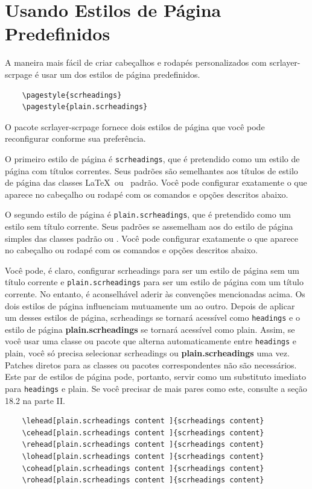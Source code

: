 \chapter{Usando Estilos de Página Predefinidos}
A maneira mais fácil de criar cabeçalhos e rodapés personalizados com scrlayer-scrpage é usar um dos estilos de página predefinidos.

\begin{verbatim}
    \pagestyle{scrheadings}
    \pagestyle{plain.scrheadings} 
\end{verbatim}

O pacote scrlayer-scrpage fornece dois estilos de página que você pode reconfigurar conforme sua preferência.

O primeiro estilo de página é \texttt{scrheadings}, que é pretendido como um estilo de página com títulos correntes. Seus padrões são semelhantes aos títulos de estilo de página das classes \LaTeX\ ou \KOMAScript\ padrão. Você pode configurar exatamente o que aparece no cabeçalho ou rodapé com os comandos e opções descritos abaixo.

O segundo estilo de página é \texttt{plain.scrheadings}, que é pretendido como um estilo sem título corrente. Seus padrões se assemelham aos do estilo de página simples das classes padrão ou \KOMAScript. Você pode configurar exatamente o que aparece no cabeçalho ou rodapé com os comandos e opções descritos abaixo.

Você pode, é claro, configurar scrheadings para ser um estilo de página sem um título corrente e \texttt{plain.scrheadings} para ser um estilo de página com um título corrente. No entanto, é aconselhável aderir às convenções mencionadas acima. Os dois estilos de página influenciam mutuamente um ao outro. Depois de aplicar um desses estilos de página, scrheadings se tornará acessível como \texttt{headings} e o estilo de página \textbf{plain.scrheadings} se tornará acessível como plain. Assim, se você usar uma classe ou pacote que alterna automaticamente entre \texttt{headings} e plain, você só precisa selecionar scrheadings ou \textbf{plain.scrheadings} uma vez. Patches diretos para as classes ou pacotes correspondentes não são necessários. Este par de estilos de página pode, portanto, servir como um substituto imediato para \texttt{headings} e plain. Se você precisar de mais pares como este, consulte a seção 18.2 na parte II.
\begin{verbatim}
    \lehead[plain.scrheadings content ]{scrheadings content}
    \cehead[plain.scrheadings content ]{scrheadings content}
    \rehead[plain.scrheadings content ]{scrheadings content}
    \lohead[plain.scrheadings content ]{scrheadings content}
    \cohead[plain.scrheadings content ]{scrheadings content}
    \rohead[plain.scrheadings content ]{scrheadings content}
\end{verbatim}

